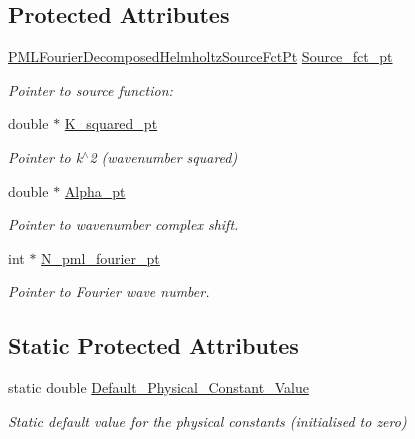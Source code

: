 \subsection*{Protected Attributes}
\begin{DoxyCompactItemize}
\item 
\hyperlink{classoomph_1_1PMLFourierDecomposedHelmholtzEquationsBase_a2e749d98392af2109b41dca0ae618b79}{P\+M\+L\+Fourier\+Decomposed\+Helmholtz\+Source\+Fct\+Pt} \hyperlink{classoomph_1_1PMLFourierDecomposedHelmholtzEquationsBase_a3406c98c232de8cce1594e728748202d}{Source\+\_\+fct\+\_\+pt}
\begin{DoxyCompactList}\small\item\em Pointer to source function\+: \end{DoxyCompactList}\item 
double $\ast$ \hyperlink{classoomph_1_1PMLFourierDecomposedHelmholtzEquationsBase_a3b73c522888222febb6a8a84fad12665}{K\+\_\+squared\+\_\+pt}
\begin{DoxyCompactList}\small\item\em Pointer to k$^\wedge$2 (wavenumber squared) \end{DoxyCompactList}\item 
double $\ast$ \hyperlink{classoomph_1_1PMLFourierDecomposedHelmholtzEquationsBase_af95cdc6837a5e405821ced25bed5a585}{Alpha\+\_\+pt}
\begin{DoxyCompactList}\small\item\em Pointer to wavenumber complex shift. \end{DoxyCompactList}\item 
int $\ast$ \hyperlink{classoomph_1_1PMLFourierDecomposedHelmholtzEquationsBase_ac6e514faad850362c6b41e1898ed27f9}{N\+\_\+pml\+\_\+fourier\+\_\+pt}
\begin{DoxyCompactList}\small\item\em Pointer to Fourier wave number. \end{DoxyCompactList}\end{DoxyCompactItemize}
\subsection*{Static Protected Attributes}
\begin{DoxyCompactItemize}
\item 
static double \hyperlink{classoomph_1_1PMLFourierDecomposedHelmholtzEquationsBase_af5c6a7867ed501132d51f3846754902f}{Default\+\_\+\+Physical\+\_\+\+Constant\+\_\+\+Value}
\begin{DoxyCompactList}\small\item\em Static default value for the physical constants (initialised to zero) \end{DoxyCompactList}\end{DoxyCompactItemize}
